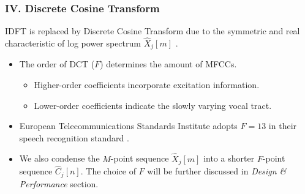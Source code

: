 
\begin{frame}
\frametitle{IV. Discrete Cosine Transform}
IDFT is replaced by Discrete Cosine Transform due to the symmetric and real characteristic of log power spectrum $\hat{X}_j[m]$ \cite{picone1993signal, iser2008bandwidth}.

\begin{itemize}
	\item The order of DCT ($F$) determines the amount of MFCCs. \cite{tan2008automatic}
	\begin{itemize}
		\item Higher-order coefficients incorporate excitation information.
		\item Lower-order coefficients indicate the slowly varying vocal tract.
	\end{itemize}
	\item European Telecommunications Standards Institute adopts $F = 13$ in their speech recognition standard \cite{etsi2001202}.
	\item We also condense the $M$-point sequence $\hat{X}_j[m]$ into a shorter $F$-point sequence $\hat{C}_j[n]$. The choice of $F$ will be further discussed in \textit{Design \& Performance} section.
\end{itemize}
\end{frame}
